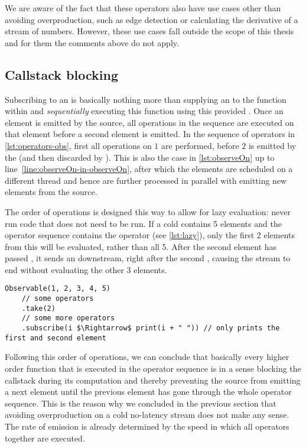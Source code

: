 We are aware of the fact that these operators also have use cases other than avoiding overproduction, such as edge detection or calculating the derivative of a stream of numbers. However, these use cases fall outside the scope of this thesis and for them the comments above do not apply.

\subsection{Callstack blocking}
Subscribing to an \obs is basically nothing more than supplying an \obv to the function within  and \emph{sequentially} executing this function using this provided \obv. Once an element is emitted by the source, all operations in the \obs sequence are executed on that element before a second element is emitted. In the sequence of operators in \autoref{lst:operators-obs}, first all operations on $1$ are performed, before $2$ is emitted by the \obs (and then discarded by ). This is also the case in \autoref{lst:observeOn} up to line~\ref{line:observeOn-in-observeOn}, after which the elements are scheduled on a different thread and hence are further processed in parallel with emitting new elements from the source.

The order of operations is designed this way to allow for lazy evaluation: never run code that does not need to be run. If a cold \obs contains 5 elements and the operator sequence contains the operator  (see \autoref{lst:lazy}), only the first 2 elements from this \obs will be evaluated, rather than all 5. After the second element has passed , it sends an  downstream, right after the second , causing the stream to end without evaluating the other 3 elements.

\begin{minipage}{\linewidth}
\begin{lstlisting}[style=ScalaStyle, caption={Lazy evaluation}, label={lst:lazy}]
Observable(1, 2, 3, 4, 5)
    // some operators
    .take(2)
    // some more operators
    .subscribe(i $\Rightarrow$ print(i + " ")) // only prints the first and second element
\end{lstlisting}
\end{minipage}

Following this order of operations, we can conclude that basically every higher order function that is executed in the operator sequence is in a sense blocking the callstack during its computation and thereby preventing the source from emitting a next element until the previous element has gone through the whole operator sequence. This is the reason why we concluded in the previous section that avoiding overproduction on a cold no-latency stream does not make any sense. The rate of emission is already determined by the speed in which all operators together are executed.


